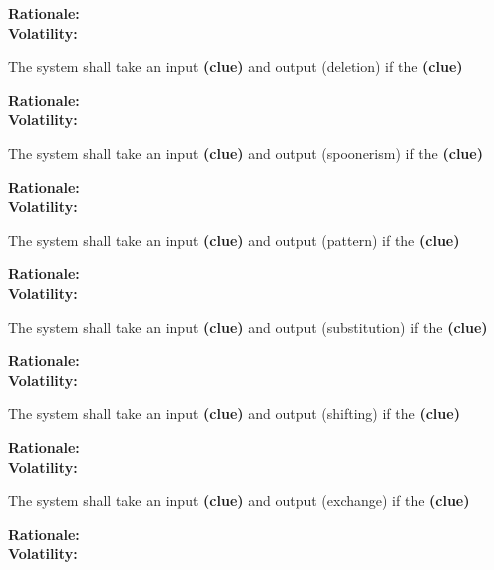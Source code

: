 \textbf{Rationale:}  \\
\textbf{Volatility:} 

\noindent\llap{\textbf{[R20/1]}}The system shall take an input \textbf{(clue)} and output (deletion) if the \textbf{(clue)}

\textbf{Rationale:}  \\
\textbf{Volatility:} 

\noindent\llap{\textbf{[R21/1]}}The system shall take an input \textbf{(clue)} and output (spoonerism) if the \textbf{(clue)}

\textbf{Rationale:}  \\
\textbf{Volatility:} 

\noindent\llap{\textbf{[R22/1]}}The system shall take an input \textbf{(clue)} and output (pattern) if the \textbf{(clue)}

\textbf{Rationale:}  \\
\textbf{Volatility:} 

\noindent\llap{\textbf{[R23/1]}}The system shall take an input \textbf{(clue)} and output (substitution) if the \textbf{(clue)}

\textbf{Rationale:}  \\
\textbf{Volatility:} 

\noindent\llap{\textbf{[R24/1]}}The system shall take an input \textbf{(clue)} and output (shifting) if the \textbf{(clue)}

\textbf{Rationale:}  \\
\textbf{Volatility:} 

\noindent\llap{\textbf{[R25/1]}}The system shall take an input \textbf{(clue)} and output (exchange) if the \textbf{(clue)}

\textbf{Rationale:}  \\
\textbf{Volatility:} 